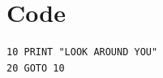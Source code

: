 \documentclass[a4paper,11pt]{report}
\begin{document}




\clearpage
{}
{}


\appendix

\chapter{Code} \label{appenddix/code}

\begin{verbatim}
10 PRINT "LOOK AROUND YOU"
20 GOTO 10
\end{verbatim}

\end{document}
